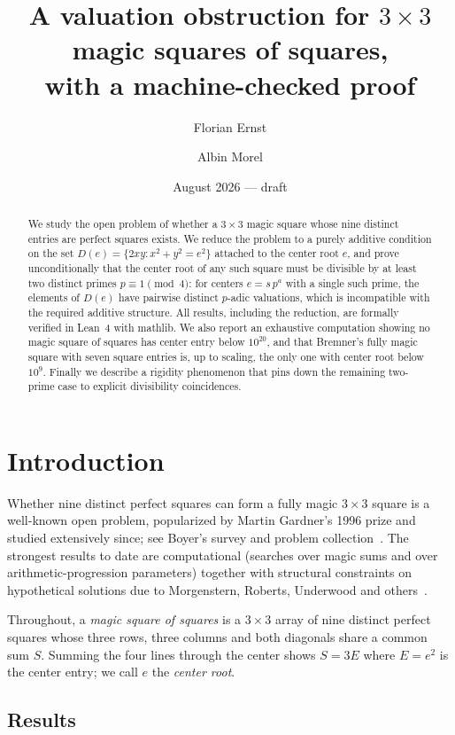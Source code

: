 \documentclass[11pt]{article}
\title{A valuation obstruction for $3\times 3$ magic squares of squares,\\
with a machine-checked proof}
\author{Florian Ernst \and Albin Morel}
\date{August 2026 --- draft}
\theoremstyle{remark}
\begin{document}
\maketitle

\begin{abstract}
We study the open problem of whether a $3\times 3$ magic square whose nine
distinct entries are perfect squares exists.  We reduce the problem to a purely
additive condition on the set $D(e)=\{2xy : x^2+y^2=e^2\}$ attached to the
center root $e$, and prove unconditionally that the center root of any such
square must be divisible by at least two distinct primes $p\equiv 1\pmod 4$:
for centers $e = s\,p^a$ with a single such prime, the elements of $D(e)$ have
pairwise distinct $p$-adic valuations, which is incompatible with the required
additive structure.  All results, including the reduction, are formally
verified in Lean~4 with mathlib.  We also report an exhaustive computation
showing no magic square of squares has center entry below $10^{20}$, and that
Bremner's fully magic square with seven square entries is, up to scaling, the
only one with center root below $10^9$.  Finally we describe a rigidity
phenomenon that pins down the remaining two-prime case to explicit divisibility
coincidences.
\end{abstract}

\section{Introduction}

Whether nine distinct perfect squares can form a fully magic $3\times 3$
square is a well-known open problem, popularized by Martin Gardner's 1996
prize and studied extensively since; see Boyer's survey and problem
collection~\cite{boyer}.  The strongest results to date are computational
(searches over magic sums and over arithmetic-progression parameters) together
with structural constraints on hypothetical solutions due to Morgenstern,
Roberts, Underwood and others~\cite{boyer}.

Throughout, a \emph{magic square of squares} is a $3\times 3$ array of nine
distinct perfect squares whose three rows, three columns and both diagonals
share a common sum $S$.  Summing the four lines through the center shows
$S = 3E$ where $E=e^2$ is the center entry; we call $e$ the \emph{center
root}.

\subsection*{Results}
\end{document}
